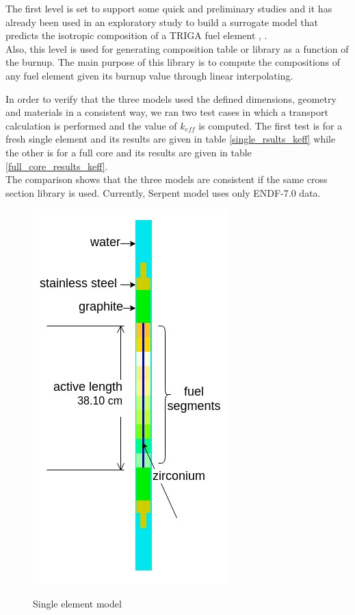 \documentclass[review,number,sort&compress,12pt]{elsarticle}
\begin{document}
The first level is set to support some quick and preliminary studies and it has already been used in an exploratory study to build a surrogate model that predicts the isotropic composition of a TRIGA fuel element \cite{abdo2018dds}, \cite{elzohery2018cbg}.\\
Also, this level is used for generating composition table or library as a function of the burnup. The main purpose of this library is to compute the compositions of any fuel element  given its burnup value through linear interpolating.

In order to verify that the three models used the defined dimensions, geometry and materials in a consistent way, we ran two test cases in which a transport calculation is performed and the value of $k_{eff}$ is computed. 
The first test is for a fresh single element and its results are given in table \ref{single_rsults_keff} while the other is for a full core and its results are given in table \ref{full_core_results_keff}.\\
The comparison shows that the three models are consistent if the same cross section library is used. Currently, Serpent model uses only ENDF-7.0 data.\\

\begin{figure}[h]
\centering
\includegraphics[scale=0.5]{single_element.jpg}\\
\caption{Single element model}
\label{fig:sigle_element_model}
\end{figure}
\end{document}
